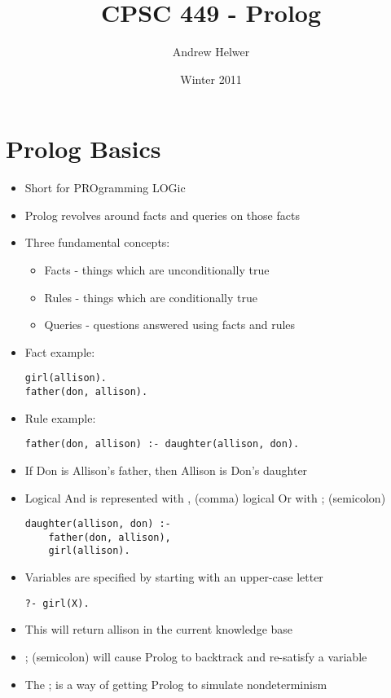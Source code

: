 \documentclass{article}
\begin{document}
\lstset{language=Prolog, frame = single}

\title{CPSC 449 - Prolog}
\author{Andrew Helwer}
\date{Winter 2011}
\maketitle

\section{Prolog Basics}

\begin{itemize}
\item Short for PROgramming LOGic
\item Prolog revolves around facts and queries on those facts
\item Three fundamental concepts:
\begin{itemize}
\item Facts - things which are unconditionally true
\item Rules - things which are conditionally true
\item Queries - questions answered using facts and rules
\end{itemize}
\item Fact example:
\begin{lstlisting}
girl(allison).
father(don, allison).
\end{lstlisting}
\item Rule example:
\begin{lstlisting}
father(don, allison) :- daughter(allison, don).
\end{lstlisting}
\item If Don is Allison's father, then Allison is Don's daughter
\item Logical And is represented with , (comma) logical Or with ; (semicolon)
\begin{lstlisting}
daughter(allison, don) :- 
	father(don, allison), 
	girl(allison).
\end{lstlisting}
\item Variables are specified by starting with an upper-case letter
\begin{lstlisting}
?- girl(X).
\end{lstlisting}
\item This will return allison in the current knowledge base
\item ; (semicolon) will cause Prolog to backtrack and re-satisfy a variable
\item The ; is a way of getting Prolog to simulate nondeterminism
\end{itemize}
\end{document}
